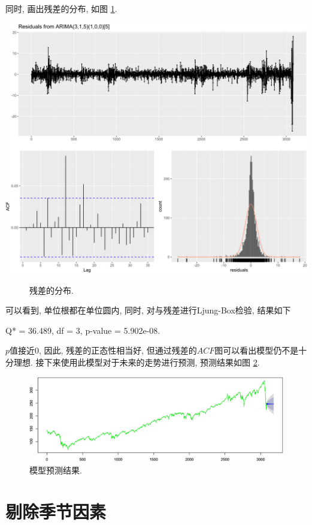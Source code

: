 \documentclass[11pt]{article}
\begin{document}
同时, 画出残差的分布, 如图 \ref{fig:m1res1}.

\begin{center}
    \hspace{-10pt}\includegraphics[width=.8\textwidth]{m1res1}
\end{center}
\begin{figure}[htbp]
    \centering
    \caption{残差的分布. \label{fig:m1res1}}
\end{figure}

\qquad 可以看到, 单位根都在单位圆内, 同时, 对与残差进行Ljung-Box检验, 结果如下
\begin{center}
    Q* = 36.489, df = 3, p-value = 5.902e-08.
\end{center}
$p$值接近0, 因此, 残差的正态性相当好, 但通过残差的$ACF$图可以看出模型仍不是十分理想. 接下来使用此模型对于未来的走势进行预测, 预测结果如图 \ref{fig:7}.
\begin{figure}
    \centering
    \includegraphics[width=.82\textwidth]{f}
    \caption{模型预测结果. \label{fig:7}}
\end{figure}







\section{剔除季节因素}
\end{document}
